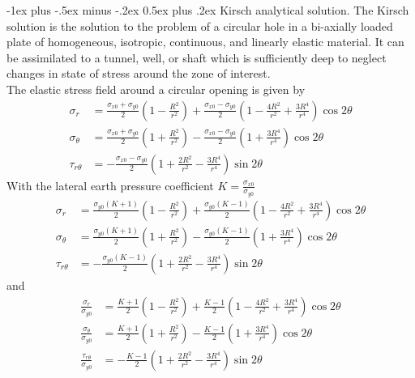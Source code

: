 \documentclass[10pt,landscape,a4paper]{article}
\makeatletter
\renewcommand{\section}{\@startsection{section}{1}{0mm}%
	{-1ex plus -.5ex minus -.2ex}%
	{0.5ex plus .2ex}%
	{\normalfont\large\bfseries}}
\makeatother
\begin{document}
\begin{multicols}{3}
		\section{Kirsch analytical solution.}
		The Kirsch solution is the solution to the problem of a circular hole in a bi-axially loaded plate of homogeneous, isotropic, continuous, and linearly elastic material.
		It can be assimilated to a tunnel, well, or shaft which is sufficiently deep to neglect changes in state of stress around the zone of interest.\\
		The elastic stress field around a circular opening is given by
			\begin{align*}
				\sigma_r &= \frac{\sigma_{x0}+\sigma_{y0}}{2}\left(1-\frac{R^2}{r^2}\right) + \frac{\sigma_{x0}-\sigma_{y0}}{2}\left(1-\frac{4R^2}{r^2}+\frac{3R^4}{r^4}\right)\cos2\theta\\
				\sigma_\theta &= \frac{\sigma_{x0}+\sigma_{y0}}{2}\left(1+\frac{R^2}{r^2}\right) - \frac{\sigma_{x0}-\sigma_{y0}}{2}\left(1+\frac{3R^4}{r^4}\right)\cos2\theta\\
				\tau_{r\theta} &= -\frac{\sigma_{x0}-\sigma_{y0}}{2}\left(1+\frac{2R^2}{r^2}-\frac{3R^4}{r^4}\right)\sin2\theta
			\end{align*}
		With the lateral earth pressure coefficient $K=\frac{\sigma_{x0}}{\sigma_{y0}}$
			\begin{align*}
				\sigma_r &= \frac{\sigma_{y0}(K+1)}{2}\left(1-\frac{R^2}{r^2}\right) + \frac{\sigma_{y0}(K-1)}{2}\left(1-\frac{4R^2}{r^2}+\frac{3R^4}{r^4}\right)\cos2\theta\\
				\sigma_\theta &= \frac{\sigma_{y0}(K+1)}{2}\left(1+\frac{R^2}{r^2}\right) - \frac{\sigma_{y0}(K-1)}{2}\left(1+\frac{3R^4}{r^4}\right)\cos2\theta\\
				\tau_{r\theta} &= -\frac{\sigma_{y0}(K-1)}{2}\left(1+\frac{2R^2}{r^2}-\frac{3R^4}{r^4}\right)\sin2\theta
			\end{align*}
		and
			\begin{align*}
				\frac{\sigma_r}{\sigma_{y0}} &= \frac{K+1}{2}\left(1-\frac{R^2}{r^2}\right) + \frac{K-1}{2}\left(1-\frac{4R^2}{r^2}+\frac{3R^4}{r^4}\right)\cos2\theta\\
				\frac{\sigma_\theta}{\sigma_{y0}} &= \frac{K+1}{2}\left(1+\frac{R^2}{r^2}\right) - \frac{K-1}{2}\left(1+\frac{3R^4}{r^4}\right)\cos2\theta\\
				\frac{\tau_{r\theta}}{\sigma_{y0}} &= -\frac{K-1}{2}\left(1+\frac{2R^2}{r^2}-\frac{3R^4}{r^4}\right)\sin2\theta
			\end{align*}
		

\end{multicols}
\end{document}
